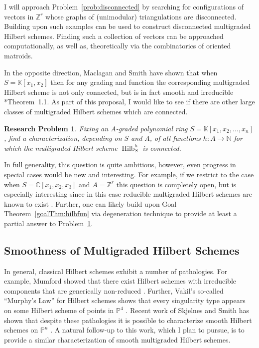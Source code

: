 \documentclass[11pt,reqno]{amsart}
\newtheorem{problem}[lemma]{Research Problem}
\theoremstyle{remark}
\newcommand{\Hilb}{\operatorname{Hilb}}
\newcommand{\C}{\mathbb{C}}
\newcommand{\K}{\mathbb{K}}
\newcommand{\N}{\mathbb{N}}
\renewcommand{\P}{\mathbb{P}}
\newcommand{\Z}{\mathbb{Z}}
\begin{document}
I will approach Problem~\ref{prob:disconnected} by searching for configurations of vectors in $\Z^{r}$ whose graphs of (unimodular) triangulations are disconnected. Building upon \cite{maclaganThomas02,santos05,heringMaclagan12} such examples can be used to construct disconnected multigraded Hilbert schemes. Finding such a collection of vectors can be approached computationally, as well as, theoretically via the combinatorics of oriented matroids.  

In the opposite direction, Maclagan and Smith have shown that when $S=\K[x_{1},x_{2}]$ then for any grading and function the corresponding multigraded Hilbert scheme is not only connected, but is in fact smooth and irreducible \cite{maclaganSmith10}*{Theorem~1.1}. As part of this proposal, I would like to see if there are other large classes of multigraded Hilbert schemes which are connected. 

\begin{problem}\label{prob:connected-mghilb}
		Fixing an $A$-graded polynomial ring $S=\K[x_{1},x_{2},\ldots,x_{n}]$, find a characterization, depending on $S$ and $A$, of all functions $h:A\to \N$ for which the multigraded Hilbert scheme $\Hilb^{h}_{S}$ is connected.
\end{problem}

In full generality, this question is quite ambitious, however, even progress in special cases would be new and interesting. For example, if we restrict to the case when $S=\C[x_{1},x_{2},x_{3}]$ and $A=\Z^{r}$ this question is completely open, but is especially interesting since in this case reducible multigraded Hilbert schemes are known to exist \cite{iarrobino72}. Further, one can likely build upon Goal Theorem~\ref{goalThm:hilbfun} via degeneration technique to provide at least a partial answer to Problem~\ref{prob:connected-mghilb}.


\subsection{Smoothness of Multigraded Hilbert Schemes}

In general, classical Hilbert schemes exhibit a number of pathologies. For example, Mumford showed that there exist Hilbert schemes with irreducible components that are generically non-reduced \cite{mumford62}. Further, Vakil's so-called ``Murphy's Law'' for Hilbert schemes shows that every singularity type appears on some Hilbert scheme of points in $\P^{4}$ \cite{vakil06}. Recent work of Skjelnes and Smith has shown that despite these pathologies it is possible to characterize smooth Hilbert schemes on $\P^{n}$ \cite{skjelnesSmith20}. A natural follow-up to this work, which I plan to pursue, is to provide a similar characterization of smooth multigraded Hilbert schemes.
\end{document}
